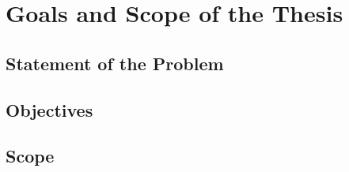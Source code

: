 \section{Goals and Scope of the Thesis}\label{sec:intro_goals_and_scope}

\subsection{Statement of the Problem}\label{sub:intro_statement_of_problem}

\subsection{Objectives}\label{sub:intro_objectives}

\subsection{Scope}\label{sub:intro_scope}
